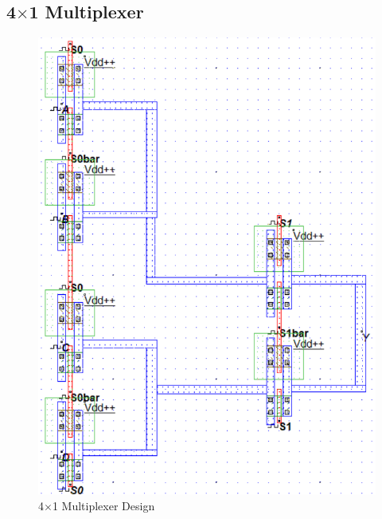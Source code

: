 \documentclass[a4paper,12pt]{article}
\begin{document}
\subsection{4$\times$1 Multiplexer}
	\begin{figure}[H]
		\centering
		\includegraphics[width=1\linewidth]{Images/3}
		\caption{4$\times$1 Multiplexer Design }
		\label{fig:1}
	\end{figure}
\end{document}
